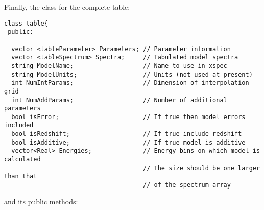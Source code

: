 \documentclass[11pt]{book}
\begin{document}
Finally, the class for the complete table:

\begin{verbatim}
class table{
 public:

  vector <tableParameter> Parameters; // Parameter information
  vector <tableSpectrum> Spectra;     // Tabulated model spectra
  string ModelName;                   // Name to use in xspec
  string ModelUnits;                  // Units (not used at present)
  int NumIntParams;                   // Dimension of interpolation grid
  int NumAddParams;                   // Number of additional parameters
  bool isError;                       // If true then model errors included
  bool isRedshift;                    // If true include redshift
  bool isAdditive;                    // If true model is additive
  vector<Real> Energies;              // Energy bins on which model is calculated
                                      // The size should be one larger than that
                                      // of the spectrum array
\end{verbatim}

and its public methods:
\end{document}
